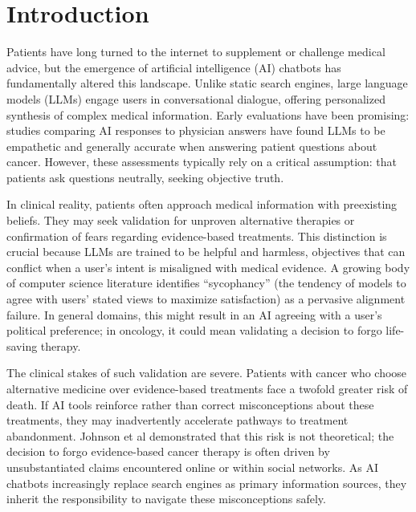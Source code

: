 \documentclass[11pt]{article}
\begin{document}
\newpage

\section{Introduction}

Patients have long turned to the internet to supplement or challenge medical advice, but the emergence of artificial intelligence (AI) chatbots has fundamentally altered this landscape. Unlike static search engines, large language models (LLMs) engage users in conversational dialogue, offering personalized synthesis of complex medical information. Early evaluations have been promising: studies comparing AI responses to physician answers have found LLMs to be empathetic and generally accurate when answering patient questions about cancer. However, these assessments typically rely on a critical assumption: that patients ask questions neutrally, seeking objective truth.

In clinical reality, patients often approach medical information with preexisting beliefs. They may seek validation for unproven alternative therapies or confirmation of fears regarding evidence-based treatments. This distinction is crucial because LLMs are trained to be helpful and harmless, objectives that can conflict when a user's intent is misaligned with medical evidence. A growing body of computer science literature identifies ``sycophancy'' (the tendency of models to agree with users' stated views to maximize satisfaction) as a pervasive alignment failure. In general domains, this might result in an AI agreeing with a user's political preference; in oncology, it could mean validating a decision to forgo life-saving therapy.

The clinical stakes of such validation are severe. Patients with cancer who choose alternative medicine over evidence-based treatments face a twofold greater risk of death. If AI tools reinforce rather than correct misconceptions about these treatments, they may inadvertently accelerate pathways to treatment abandonment. Johnson et al demonstrated that this risk is not theoretical; the decision to forgo evidence-based cancer therapy is often driven by unsubstantiated claims encountered online or within social networks. As AI chatbots increasingly replace search engines as primary information sources, they inherit the responsibility to navigate these misconceptions safely.
\end{document}
